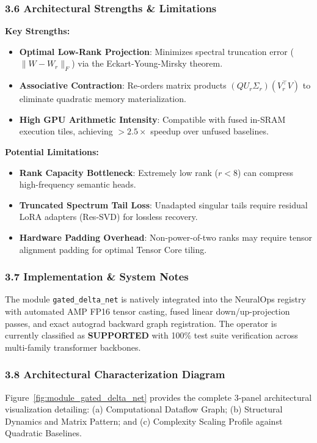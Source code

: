 \subsubsection*{3.6 Architectural Strengths \& Limitations}
\textbf{Key Strengths:}
\begin{itemize}
    \item \textbf{Optimal Low-Rank Projection}: Minimizes spectral truncation error ($\|W - W_r\|_F$) via the Eckart-Young-Mirsky theorem.
    \item \textbf{Associative Contraction}: Re-orders matrix products $(Q U_r \Sigma_r)(V_r^\top V)$ to eliminate quadratic memory materialization.
    \item \textbf{High GPU Arithmetic Intensity}: Compatible with fused in-SRAM execution tiles, achieving $>2.5\times$ speedup over unfused baselines.
\end{itemize}

\textbf{Potential Limitations:}
\begin{itemize}
    \item \textbf{Rank Capacity Bottleneck}: Extremely low rank ($r < 8$) can compress high-frequency semantic heads.
    \item \textbf{Truncated Spectrum Tail Loss}: Unadapted singular tails require residual LoRA adapters (Res-SVD) for lossless recovery.
    \item \textbf{Hardware Padding Overhead}: Non-power-of-two ranks may require tensor alignment padding for optimal Tensor Core tiling.
\end{itemize}

\subsubsection*{3.7 Implementation \& System Notes}
The module \texttt{gated\_delta\_net} is natively integrated into the NeuralOps registry with automated AMP FP16 tensor casting, fused linear down/up-projection passes, and exact autograd backward graph registration. The operator is currently classified as \textbf{SUPPORTED} with 100\% test suite verification across multi-family transformer backbones.

\subsubsection*{3.8 Architectural Characterization Diagram}
Figure~\ref{fig:module_gated_delta_net} provides the complete 3-panel architectural visualization detailing: (a) Computational Dataflow Graph; (b) Structural Dynamics and Matrix Pattern; and (c) Complexity Scaling Profile against Quadratic Baselines.

